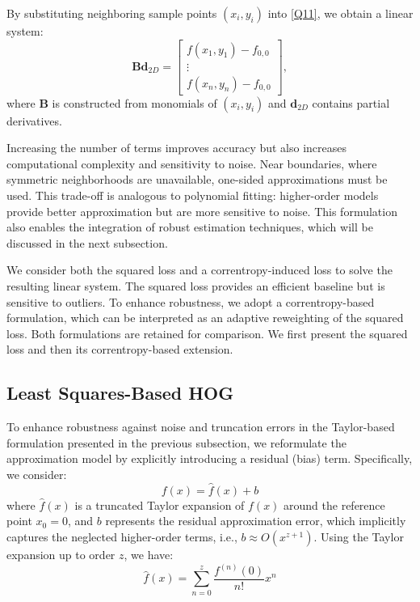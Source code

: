 \documentclass{elsarticle}
\begin{document}
By substituting neighboring sample points $(x_i,y_i)$ into \eqref{Q11}, we obtain a linear system:
\begin{equation}\label{Q12}
	\mathbf{B}\mathbf{d}_{2D} =
	\begin{bmatrix}
		f(x_1,y_1)-f_{0,0} \\
		\vdots \\
		f(x_n,y_n)-f_{0,0}
	\end{bmatrix},
\end{equation}
where $\mathbf{B}$ is constructed from monomials of $(x_i,y_i)$ and $\mathbf{d}_{2D}$ contains partial derivatives.

Increasing the number of terms improves accuracy but also increases computational complexity and sensitivity to noise. Near boundaries, where symmetric neighborhoods are unavailable, one-sided approximations must be used. This trade-off is analogous to polynomial fitting: higher-order models provide better approximation but are more sensitive to noise. This formulation also enables the integration of robust estimation techniques, which will be discussed in the next subsection.

We consider both the squared loss and a correntropy-induced loss to solve the resulting linear system. The squared loss provides an efficient baseline but is sensitive to outliers. To enhance robustness, we adopt a correntropy-based formulation, which can be interpreted as an adaptive reweighting of the squared loss. Both formulations are retained for comparison. We first present the squared loss and then its correntropy-based extension.

\subsection{Least Squares-Based HOG}

To enhance robustness against noise and truncation errors in the Taylor-based formulation presented in the previous subsection, we reformulate the approximation model by explicitly introducing a residual (bias) term. Specifically, we consider:
\begin{equation}\label{QSM}
	f(x) = \hat{f}(x) + b
\end{equation}
where $\hat{f}(x)$ is a truncated Taylor expansion of $f(x)$ around the reference point $x_0 = 0$, and $b$ represents the residual approximation error, which implicitly captures the neglected higher-order terms, i.e., $b \approx O(x^{z+1})$. Using the Taylor expansion up to order $z$, we have:
\begin{equation}
	\hat{f}(x)=\sum_{n=0}^{z}\frac{f^{(n)}(0)}{n!}x^n
\end{equation}
\end{document}
